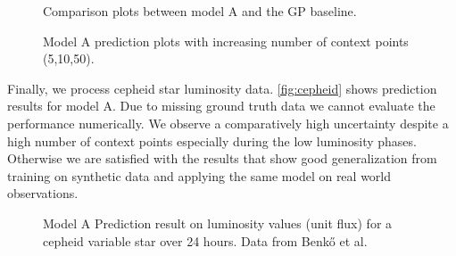 	\begin{figure*}
	\centering
	\resizebox{0.7\textwidth}{!}{
		
		
	}
\label{fig:gp_comp}
\caption{Comparison plots between model A and the GP baseline.}
\end{figure*}

	\begin{figure*}
	\centering
	\resizebox{0.9\textwidth}{!}{
		
		
		
	}
\label{fig:result_plot}
\caption{Model A prediction plots with increasing number of context points (5,10,50).}
\end{figure*}

Finally, we process cepheid star luminosity data. \autoref{fig:cepheid} shows prediction results for model A. Due to missing ground truth data we cannot evaluate the performance numerically. We observe a comparatively high uncertainty despite a high number of context points especially during the low luminosity phases. Otherwise we are satisfied with the results that show good generalization from training on synthetic data and applying the same model on real world observations.

\begin{figure*}
	\centering
	\resizebox{0.6\textwidth}{!}{
		
		
	}
\label{fig:cepheid}
\caption{Model A Prediction result on luminosity values (unit flux) for a cepheid variable star over 24 hours. Data from Benkő et al. \cite{Benk__2014}}
\end{figure*}